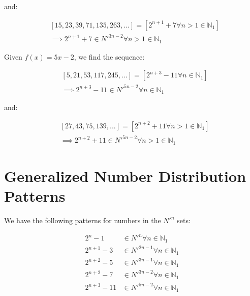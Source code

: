 \documentclass{article}
\begin{document}
\noindent
and:

\begin{displaymath}\begin{aligned}
& [15, 23, 39, 71, 135, 263, ...] = [2^{n+1}+7 \forall n>1 \in \mathbb{N}_{1}] \\
& \implies 2^{n+1}+7 \in N'^{3n-2} \forall n>1 \in \mathbb{N}_{1}
\end{aligned}\end{displaymath}

\noindent
Given \begin{math}f(x)=5x-2\end{math}, we find the sequence:

\begin{displaymath}\begin{aligned}
& [5, 21, 53, 117, 245, ...] = [2^{n+3}-11 \forall n \in \mathbb{N}_{1}] \\
& \implies 2^{n+3}-11 \in N'^{5n-2} \forall n \in \mathbb{N}_{1}
\end{aligned}\end{displaymath}

\noindent
and:

\begin{displaymath}\begin{aligned}
& [27, 43, 75, 139, ...] = [2^{n+2}+11 \forall n>1 \in \mathbb{N}_{1}] \\
& \implies 2^{n+2}+11 \in N'^{5n-2} \forall n>1 \in \mathbb{N}_{1}
\end{aligned}\end{displaymath}

\section{Generalized Number Distribution Patterns}

We have the following patterns for numbers in the \begin{math}N'^n\end{math}
sets:

\begin{displaymath}\begin{aligned}
2^n-1      & \in N'^n      \forall n \in \mathbb{N}_{1} \\
2^{n+1}-3  & \in N'^{2n-1} \forall n \in \mathbb{N}_{1} \\
2^{n+2}-5  & \in N'^{3n-1} \forall n \in \mathbb{N}_{1} \\
2^{n+2}-7  & \in N'^{3n-2} \forall n \in \mathbb{N}_{1} \\
2^{n+3}-11 & \in N'^{5n-2} \forall n \in \mathbb{N}_{1}
\end{aligned}\end{displaymath}
\end{document}
